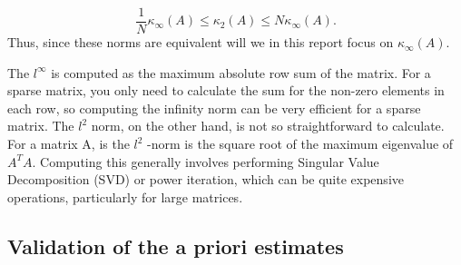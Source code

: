 \[
\frac{1}{N} \kappa_{\infty} ( A) \le  \kappa_{2} ( A) \le N \kappa _{\infty}(A)    .
\]
Thus, since these norms are equivalent will we in this report focus on $ \kappa_{\infty}( A)  $.
\begin{remark}
 The $l^{\infty}$ is computed as the maximum absolute row sum of the matrix. For a sparse matrix, you only need to calculate the sum for the non-zero elements in each row, so computing the infinity norm can be very efficient for a sparse matrix. The
 $l^{2}$ norm, on the other hand, is not so straightforward to calculate. For a matrix A, is the $l^{2}$ -norm is the square root of the maximum eigenvalue of $A^T  A$. Computing this generally involves performing Singular Value Decomposition (SVD)
 or power iteration, which can be quite expensive operations, particularly for large matrices.
\end{remark}

\subsection{Validation of the a priori estimates }%
\label{ssub:numerical_results}

